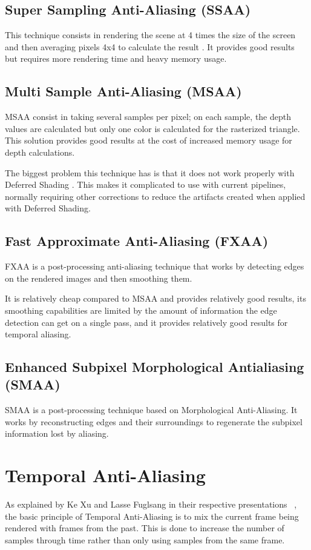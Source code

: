 \documentclass{cslthse-msc}
\begin{document}
\subsection{Super Sampling Anti-Aliasing (SSAA)}
This technique consists in rendering the scene at 4 times the size of the screen and then averaging pixels 4x4 to calculate the result \cite{Doggett2017EDAN35}. It provides good results but requires more rendering time and heavy memory usage.

\subsection{Multi Sample Anti-Aliasing (MSAA)}
MSAA consist in taking several samples per pixel; on each sample, the depth values are calculated but only one color is calculated for the rasterized triangle. This solution provides good results at the cost of increased memory usage for depth calculations. 

The biggest problem this technique has is that it does not work properly with Deferred Shading \cite{Doggett2017EDAN35}. This makes it complicated to use with current pipelines, normally requiring other corrections to reduce the artifacts created when applied with Deferred Shading.

\subsection{Fast Approximate Anti-Aliasing (FXAA)}
FXAA is a post-processing anti-aliasing technique that works by detecting edges on the rendered images and then smoothing them. \cite{Lottes2009}

It is relatively cheap compared to MSAA and provides relatively good results, its smoothing capabilities are limited by the amount of information the edge detection can get on a single pass, and it provides relatively good results for temporal aliasing.

\subsection{Enhanced Subpixel Morphological Antialiasing (SMAA)}
SMAA is a post-processing technique based on Morphological Anti-Aliasing. It works by reconstructing edges and their surroundings to regenerate the subpixel information lost by aliasing. \cite{Jimenez2012}

\section{Temporal Anti-Aliasing}
As explained by Ke Xu and Lasse Fuglsang in their respective presentations ~\cite{XU2016,Fuglsand2016}, the basic principle of Temporal Anti-Aliasing is to mix the current frame being rendered with frames from the past. This is done to increase the number of samples through time rather than only using samples from the same frame. 
\end{document}
